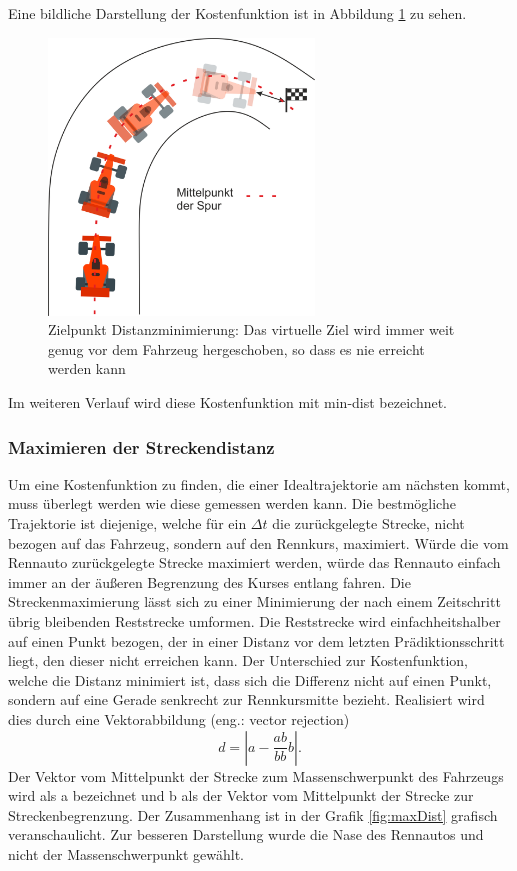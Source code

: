 \documentclass{like}
\begin{document}
Eine bildliche Darstellung der Kostenfunktion ist in Abbildung \ref{fig:costGoalDist} zu sehen. 

\begin{figure}[ht!]
	\centering
	\includegraphics[width=200pt]{Abbildungen/costGoalDist.png}
	\caption{Zielpunkt Distanzminimierung: Das virtuelle Ziel wird immer weit genug vor dem Fahrzeug hergeschoben, so dass es nie erreicht werden kann}
	\label{fig:costGoalDist}
\end{figure}
Im weiteren Verlauf wird diese Kostenfunktion mit min-dist bezeichnet.

\subsubsection*{Maximieren der Streckendistanz}
Um eine Kostenfunktion zu finden, die einer Idealtrajektorie am nächsten kommt, muss überlegt werden wie diese gemessen werden kann. Die bestmögliche Trajektorie ist diejenige, welche für ein $\Delta t$ die zurückgelegte Strecke, nicht bezogen auf das Fahrzeug, sondern auf den Rennkurs, maximiert. Würde die vom Rennauto zurückgelegte Strecke maximiert werden, würde das Rennauto einfach immer an der äußeren Begrenzung des Kurses entlang fahren. Die Streckenmaximierung lässt sich zu einer Minimierung der nach einem Zeitschritt übrig bleibenden Reststrecke umformen. Die Reststrecke wird einfachheitshalber auf einen Punkt bezogen, der in einer Distanz vor dem letzten Prädiktionsschritt liegt, den dieser nicht erreichen kann. Der Unterschied zur Kostenfunktion, welche die Distanz minimiert ist, dass sich die Differenz nicht auf einen Punkt, sondern auf eine Gerade senkrecht zur Rennkursmitte bezieht.
Realisiert wird dies durch eine Vektorabbildung (eng.: vector rejection)
\begin{equation}
	d = |a - \frac{ab}{bb}b|.
\end{equation}
Der Vektor vom Mittelpunkt der Strecke zum Massenschwerpunkt des Fahrzeugs wird als a bezeichnet und b als der Vektor vom Mittelpunkt der Strecke zur Streckenbegrenzung.
Der Zusammenhang ist in der Grafik \ref{fig:maxDist} grafisch  veranschaulicht. Zur besseren Darstellung wurde die Nase des Rennautos und nicht der Massenschwerpunkt gewählt.
\end{document}

